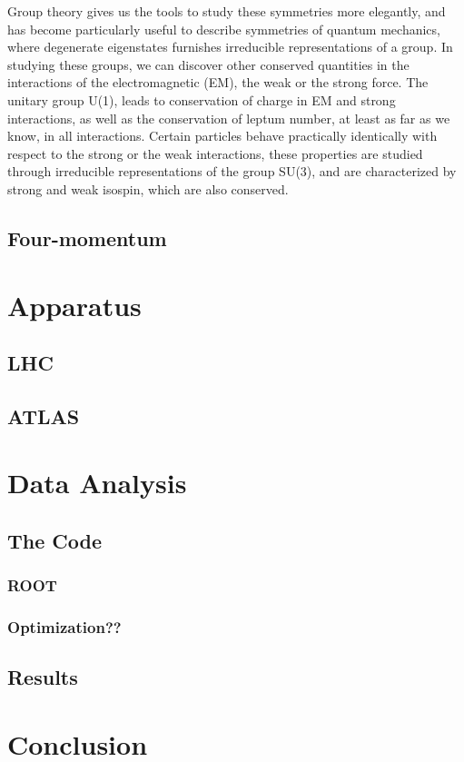 \documentclass[11pt,a4paper]{article}
\begin{document}
Group theory gives us the tools to study these symmetries more elegantly, and
has become particularly useful to describe symmetries of quantum mechanics,
where degenerate eigenstates furnishes irreducible representations of a group.
In studying these groups, we can discover other conserved quantities in the
interactions of the electromagnetic (EM), the weak or the strong force. The
unitary group U(1), leads to conservation of charge in EM and strong
interactions, as well as the conservation of leptum number, at least as far as
we know, in all interactions. Certain particles behave practically identically
with respect to the strong or the weak interactions, these properties are
studied through irreducible representations of the group SU(3), and are
characterized by strong and weak isospin, which are also conserved.

\subsection{Four-momentum}

\section{Apparatus}

\subsection{LHC}

\subsection{ATLAS}

\section{Data Analysis}

\subsection{The Code}

\subsubsection{ROOT}

\subsubsection{Optimization??}

\subsection{Results}

\section{Conclusion}

\printbibliography
\end{document}
